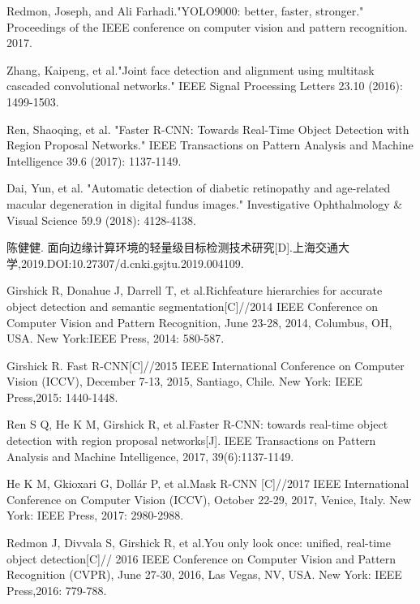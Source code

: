 \documentclass{ctexart}
\numberwithin{equation}{section}%
\numberwithin{figure}{section}%
\numberwithin{table}{section}%
\begin{document}
	\newpage
	\begin{thebibliography}{99}
	Redmon, Joseph, and Ali Farhadi."YOLO9000: better, faster, stronger." Proceedings of the IEEE conference on computer vision and pattern recognition. 2017.
	
	Zhang, Kaipeng, et al."Joint face detection and alignment using multitask cascaded convolutional networks." IEEE Signal Processing Letters 23.10 (2016): 1499-1503.
	
	Ren, Shaoqing, et al. "Faster R-CNN: Towards Real-Time Object Detection with Region Proposal Networks." IEEE Transactions on Pattern Analysis and Machine Intelligence 39.6 (2017): 1137-1149.
	
	
	Dai, Yun, et al. "Automatic detection of diabetic retinopathy and age-related macular degeneration in digital fundus images." Investigative Ophthalmology \& Visual Science 59.9 (2018): 4128-4138.
	
	陈健健. 面向边缘计算环境的轻量级目标检测技术研究[D].上海交通大学,2019.DOI:10.27307/d.cnki.gsjtu.2019.004109.
	
	
	Girshick R, Donahue J, Darrell T, et al.Richfeature hierarchies for accurate object detection and semantic segmentation[C]//2014 IEEE Conference on Computer Vision and Pattern Recognition, June 23-28, 2014, Columbus, OH, USA. New York:IEEE Press, 2014: 580-587.
	
	Girshick R. Fast R-CNN[C]//2015 IEEE International Conference on Computer Vision (ICCV), December 7-13, 2015, Santiago, Chile. New York: IEEE Press,2015: 1440-1448.
	
	Ren S Q, He K M, Girshick R, et al.Faster R-CNN: towards real-time object detection with region proposal networks[J]. IEEE Transactions on Pattern Analysis and Machine Intelligence, 2017, 39(6):1137-1149.
	
	He K M, Gkioxari G, Dollár P, et al.Mask R-CNN [C]//2017 IEEE International Conference on Computer Vision (ICCV), October 22-29, 2017, Venice, Italy. New York: IEEE Press, 2017: 2980-2988.
	
	Redmon J, Divvala S, Girshick R, et al.You only look once: unified, real-time object detection[C]// 2016 IEEE Conference on Computer Vision and Pattern Recognition (CVPR), June 27-30, 2016, Las Vegas, NV, USA. New York: IEEE Press,2016: 779-788.
	

\end{thebibliography}
\end{document}
